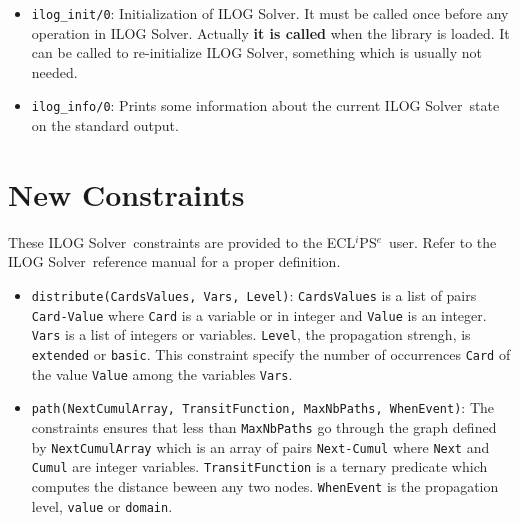 \documentclass{article}
\newcommand{\solver}{ILOG Solver}
\newcommand{\eclipse}{ECL$^i$PS$^e$}
\begin{document}
\begin{itemize}
 \item \verb"ilog_init/0": Initialization of \solver. It must be called once
 before any operation in \solver. Actually {\bf it is called} when the library
 is loaded. It can be called to re-initialize \solver, something which is
 usually not needed.
 \item \verb"ilog_info/0": Prints some information about the current \solver\
 state on the standard output.
\end{itemize}



\section{New Constraints}
These \solver\ constraints are provided to the \eclipse\ user. Refer to the
\solver\ reference manual for a proper definition.

\begin{itemize}
 \item \verb"distribute(CardsValues, Vars, Level)": \verb"CardsValues" is a list of
 pairs \verb"Card-Value" where \verb"Card" is a variable or in integer and
 \verb"Value" is an integer. \verb"Vars" is a list of integers or variables.
 \verb"Level", the propagation strengh, is \verb"extended" or
 \verb"basic". This constraint specify the number of occurrences \verb"Card" of
 the value \verb"Value" among the variables \verb"Vars".
 \item \verb"path(NextCumulArray, TransitFunction, MaxNbPaths, WhenEvent)": The
 constraints ensures that less than \verb"MaxNbPaths" go through the graph
 defined by \verb"NextCumulArray" which is an array of pairs \verb"Next-Cumul"
 where \verb"Next" and \verb"Cumul" are integer
 variables. \verb"TransitFunction" is a ternary predicate which computes the
 distance beween any two nodes. \verb"WhenEvent" is the propagation level,
 \verb"value" or \verb"domain".
\end{itemize}
\end{document}
